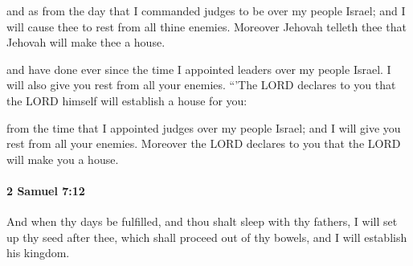 			\begin{versebox}
					\item[BHS] 
					\item[ASV] and as from the day that I commanded judges to be over my people Israel; and I will cause thee to rest from all thine enemies. Moreover Jehovah telleth thee that Jehovah will make thee a house.
					\item[NIV] and have done ever since the time I appointed leaders over my people Israel. I will also give you rest from all your enemies. “’The LORD declares to you that the LORD himself will establish a house for you:
					\item[NRSV] from the time that I appointed judges over my people Israel; and I will give you rest from all your enemies. Moreover the LORD declares to you that the LORD will make you a house.
			\end{versebox}

		\paragraph{2 Samuel 7:12} %
			\label{2SAMUEL-7-12}

			And when thy days be fulfilled, and thou shalt sleep with thy fathers, I will set up thy seed after thee, which shall proceed out of thy bowels, and I will establish his kingdom.

